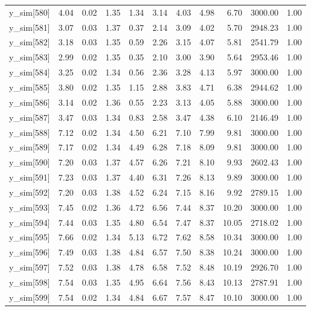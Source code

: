 \begin{table}[ht]
\begin{tabular}{rrrrrrrrrrr}
  y\_sim[580] & 4.04 & 0.02 & 1.35 & 1.34 & 3.14 & 4.03 & 4.98 & 6.70 & 3000.00 & 1.00 \\ 
  y\_sim[581] & 3.07 & 0.03 & 1.37 & 0.37 & 2.14 & 3.09 & 4.02 & 5.70 & 2948.23 & 1.00 \\ 
  y\_sim[582] & 3.18 & 0.03 & 1.35 & 0.59 & 2.26 & 3.15 & 4.07 & 5.81 & 2541.79 & 1.00 \\ 
  y\_sim[583] & 2.99 & 0.02 & 1.35 & 0.35 & 2.10 & 3.00 & 3.90 & 5.64 & 2953.46 & 1.00 \\ 
  y\_sim[584] & 3.25 & 0.02 & 1.34 & 0.56 & 2.36 & 3.28 & 4.13 & 5.97 & 3000.00 & 1.00 \\ 
  y\_sim[585] & 3.80 & 0.02 & 1.35 & 1.15 & 2.88 & 3.83 & 4.71 & 6.38 & 2944.62 & 1.00 \\ 
  y\_sim[586] & 3.14 & 0.02 & 1.36 & 0.55 & 2.23 & 3.13 & 4.05 & 5.88 & 3000.00 & 1.00 \\ 
  y\_sim[587] & 3.47 & 0.03 & 1.34 & 0.83 & 2.58 & 3.47 & 4.38 & 6.10 & 2146.49 & 1.00 \\ 
  y\_sim[588] & 7.12 & 0.02 & 1.34 & 4.50 & 6.21 & 7.10 & 7.99 & 9.81 & 3000.00 & 1.00 \\ 
  y\_sim[589] & 7.17 & 0.02 & 1.34 & 4.49 & 6.28 & 7.18 & 8.09 & 9.81 & 3000.00 & 1.00 \\ 
  y\_sim[590] & 7.20 & 0.03 & 1.37 & 4.57 & 6.26 & 7.21 & 8.10 & 9.93 & 2602.43 & 1.00 \\ 
  y\_sim[591] & 7.23 & 0.03 & 1.37 & 4.40 & 6.31 & 7.26 & 8.13 & 9.89 & 3000.00 & 1.00 \\ 
  y\_sim[592] & 7.20 & 0.03 & 1.38 & 4.52 & 6.24 & 7.15 & 8.16 & 9.92 & 2789.15 & 1.00 \\ 
  y\_sim[593] & 7.45 & 0.02 & 1.36 & 4.72 & 6.56 & 7.44 & 8.37 & 10.20 & 3000.00 & 1.00 \\ 
  y\_sim[594] & 7.44 & 0.03 & 1.35 & 4.80 & 6.54 & 7.47 & 8.37 & 10.05 & 2718.02 & 1.00 \\ 
  y\_sim[595] & 7.66 & 0.02 & 1.34 & 5.13 & 6.72 & 7.62 & 8.58 & 10.34 & 3000.00 & 1.00 \\ 
  y\_sim[596] & 7.49 & 0.03 & 1.38 & 4.84 & 6.57 & 7.50 & 8.38 & 10.24 & 3000.00 & 1.00 \\ 
  y\_sim[597] & 7.52 & 0.03 & 1.38 & 4.78 & 6.58 & 7.52 & 8.48 & 10.19 & 2926.70 & 1.00 \\ 
  y\_sim[598] & 7.54 & 0.03 & 1.35 & 4.95 & 6.64 & 7.56 & 8.43 & 10.13 & 2787.91 & 1.00 \\ 
  y\_sim[599] & 7.54 & 0.02 & 1.34 & 4.84 & 6.67 & 7.57 & 8.47 & 10.10 & 3000.00 & 1.00 \\ 

\end{tabular}
\end{table}
